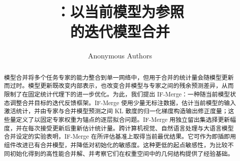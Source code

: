 \documentclass{article}
\title{\normalfont\bfseries \method{}：以当前模型为参照\\的迭代模型合并}
\author{Anonymous Authors}
\theoremstyle{definition}
\numberwithin{equation}{section}
\begin{document}
\maketitle
\begin{abstract}
模型合并将多个任务专家的能力整合到单一网络中，但用于合并的统计量会随模型更新而过时。模型更新既改变内部表示，也改变合并模型与专家之间的残余预测差异，从而限制了在固定统计代理下的进一步优化。为此，我们提出 IF-Merge：一种随当前模型状态调整合并目标的迭代反馈框架。IF-Merge 使用少量无标注数据，估计当前模型的输入激活统计，并由专家与合并模型预测之间 KL 散度的归一化梯度构造输出修正度量；这些量定义了以固定专家权重为锚点的逐层拟合问题。IF-Merge 用独立留出集选择更新幅度，并在每次接受更新后重新估计统计量。跨计算机视觉、自然语言处理与大语言模型合并设定的实验表明，IF-Merge 在所评估基准上取得当前最优结果。它可作为即插即用组件改进已有合并模型，并降低对初始化的敏感度。这种更低的起点敏感性，为比较不同初始化得到的高性能合并解、并考察它们在权重空间中的几何结构提供了经验基础。
\end{abstract}






\clearpage



\clearpage
\appendix

\end{document}
